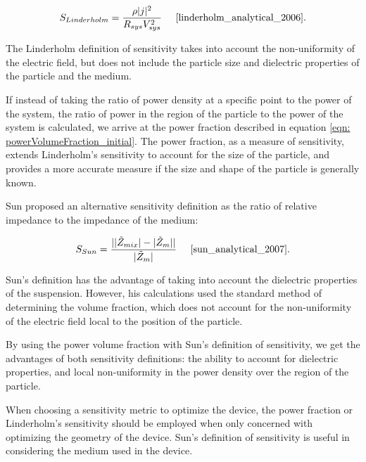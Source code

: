 \begin{equation}
    S_{Linderholm} = \frac{\rho |j|^2}{R_{sys}V_{sys}^2} \;\;\;\;\;\cite{linderholm_analytical_2006}.
    \label{eqn:Linderholtz}
\end{equation}

\noindent The Linderholm definition of sensitivity takes into account the non-uniformity of the electric field, but does not include the particle size and dielectric properties of the particle and the medium.

\par If instead of taking the ratio of power density at a specific point to the power of the system, the ratio of power in the region of the particle to the power of the system is calculated, we arrive at the power fraction described in equation \ref{eqn: powerVolumeFraction_initial}. The power fraction, as a measure of sensitivity, extends Linderholm's sensitivity to account for the size of the particle, and provides a more accurate measure if the size and shape of the particle is generally known.

\par Sun proposed an alternative sensitivity definition as the ratio of relative impedance to the impedance of the medium:

\begin{equation}
    S_{Sun} = \frac{| |\Tilde{Z}_{mix}| - |\Tilde{Z}_m| |}{|\Tilde{Z}_m|} \;\;\;\;\; \cite{sun_analytical_2007}.
    \label{eqn:Sun_sensitivity}
\end{equation}

\par Sun's definition has the advantage of taking into account the dielectric properties of the suspension. However, his calculations used the standard method of determining the volume fraction, which does not account for the non-uniformity of the electric field local to the position of the particle. 

\par By using the power volume fraction with Sun's definition of sensitivity, we get the advantages of both sensitivity definitions: the ability to account for dielectric properties, and local non-uniformity in the power density over the region of the particle.

\par When choosing a sensitivity metric to optimize the device, the power fraction or Linderholm's sensitivity should be employed when only concerned with optimizing the geometry of the device. Sun's definition of sensitivity is useful in considering the medium used in the device.



